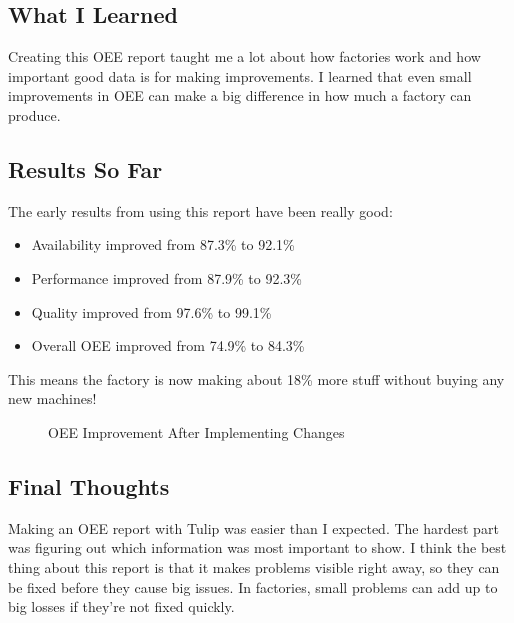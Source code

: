 \documentclass{article}
\begin{document}
\subsection{What I Learned}
Creating this OEE report taught me a lot about how factories work and how important good data is for making improvements. I learned that even small improvements in OEE can make a big difference in how much a factory can produce.

\subsection{Results So Far}
The early results from using this report have been really good:

\begin{itemize}
    \item Availability improved from 87.3\% to 92.1\%
    \item Performance improved from 87.9\% to 92.3\%
    \item Quality improved from 97.6\% to 99.1\%
    \item Overall OEE improved from 74.9\% to 84.3\%
\end{itemize}

This means the factory is now making about 18\% more stuff without buying any new machines!

\begin{figure}[H]
\centering
{}
\caption{OEE Improvement After Implementing Changes}
\end{figure}

\subsection{Final Thoughts}
Making an OEE report with Tulip was easier than I expected. The hardest part was figuring out which information was most important to show. I think the best thing about this report is that it makes problems visible right away, so they can be fixed before they cause big issues. In factories, small problems can add up to big losses if they're not fixed quickly.
\end{document}
